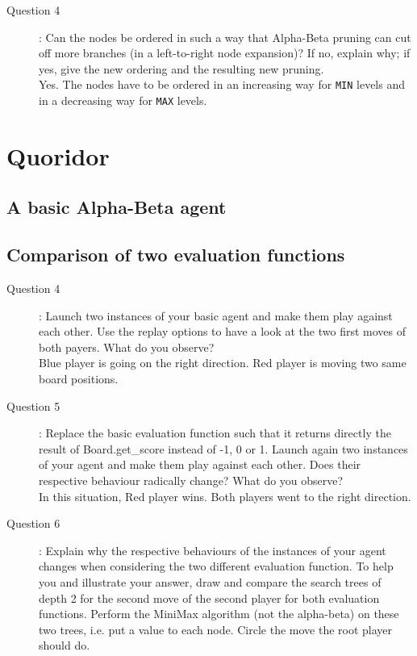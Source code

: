 \begin{description}
\item[Question 4]: Can the nodes be ordered in such a way that Alpha-Beta pruning can cut off more branches (in a left-to-right node expansion)? If no, explain why; if yes, give the new ordering and the resulting new pruning.\\
Yes. The nodes have to be ordered in an increasing way for \texttt{MIN} levels and in a decreasing way for \texttt{MAX} levels. 
\end{description}

\section{Quoridor}
\subsection{A basic Alpha-Beta agent}
\subsection{Comparison of two evaluation functions}
\begin{description}
\item[Question 4]: Launch two instances of your basic agent and make them play against each other. Use the replay options to have a look at the two first moves of both payers. What do you observe?\\
Blue player is going on the right direction. Red player is moving two same board positions. 
\item[Question 5]: Replace the basic evaluation function such that it returns directly the result of Board.get\_score instead of -1, 0 or 1. Launch again two instances of your agent and make them play against each other. Does their respective behaviour radically change? What do you observe?\\
In this situation, Red player wins. Both players went to the right direction.
\item[Question 6]: Explain why the respective behaviours of the instances of your agent changes when considering the two different evaluation function. To help you and illustrate your answer, draw and compare the search trees of depth 2 for the second move of the second player for both evaluation functions. Perform the MiniMax algorithm (not the alpha-beta) on these two trees, i.e. put a value to each node. Circle the move the root player should do.\\
\end{description}


